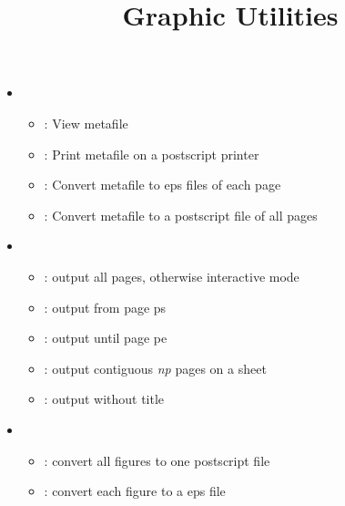 \documentclass[12pt]{article}
\begin{document}
\title{Graphic Utilities}
\begin{itemize}
\item
{}
\begin{itemize}
\item
{}: View metafile
\item
{}: Print metafile on a postscript printer
\item
{}: Convert metafile to eps files of each page
\item
{}: Convert metafile to a postscript file of all pages
\end{itemize}
\item
{}
\begin{itemize}
\item
{}: output all pages, otherwise interactive mode
\item
{}: output from page ps
\item
{}: output until page pe
\item
{}: output contiguous \textit{np} pages on a sheet
\item
{}: output without title
\end{itemize}
\item
  \begin{itemize}
    \item
      : convert all figures to one postscript file
    \item
      : convert each figure to a eps file
  \end{itemize}
\end{itemize}
\end{document}
